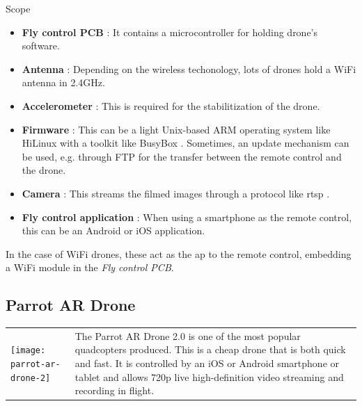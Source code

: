 \begin{chaptercover}{Scope}
\begin{itemize}
  \item \textbf{Fly control PCB} : It contains a microcontroller for holding drone's software.
  \item \textbf{Antenna} : Depending on the wireless techonology, lots of drones hold a WiFi antenna in 2.4GHz.
  \item \textbf{Accelerometer} : This is required for the stabilitization of the drone.
  \item \textbf{Firmware} : This can be a light Unix-based ARM operating system like HiLinux \cite{hilinux} with a toolkit like BusyBox \cite{busybox}. Sometimes, an update mechanism can be used, e.g. through FTP for the transfer between the remote control and the drone.
  \item \textbf{Camera} : This streams the filmed images through a protocol like \acrshort{rtsp} \cite{rfc7826}.
  \item \textbf{Fly control application} : When using a smartphone as the remote control, this can be an Android or iOS application.
\end{itemize}

In the case of WiFi drones, these act as the \acrfull{ap} to the remote control, embedding a WiFi module in the \textit{Fly control PCB}.

\subsection{Parrot AR Drone}

\begin{center}
\begin{tabular}{m{5cm}m{12.3cm}}
\hyphenation{produced}
\texttt{[image: parrot-ar-drone-2]} & The Parrot AR Drone 2.0 is one of the most popular quadcopters produced. This is a cheap drone that is both quick and fast. It is controlled by an iOS or Android smartphone or tablet and allows 720p live high-definition video streaming and recording in flight. \\
\end{tabular}
\end{center}


\end{chaptercover}
